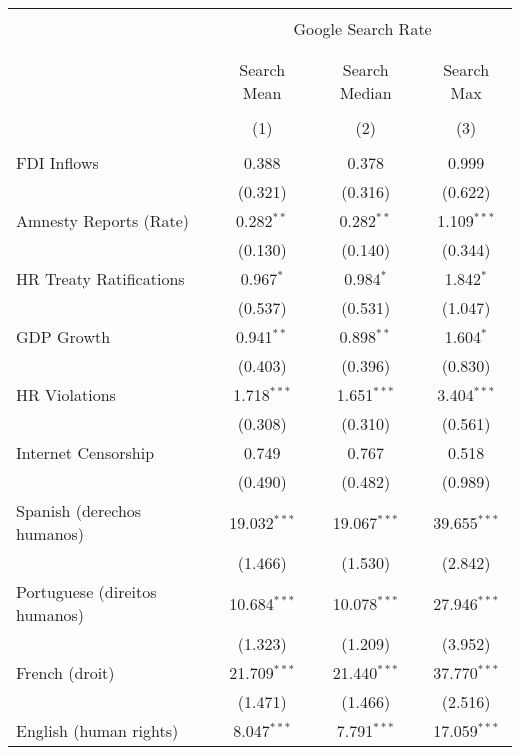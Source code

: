 
\begin{table}[!htbp] \centering 
  \caption{} 
  \label{} 
\begin{tabular}{@{\extracolsep{5pt}}lccc} 
\\[-1.8ex]\hline 
\hline \\[-1.8ex] 
 & \multicolumn{3}{c}{Google Search Rate} \\ 
\cline{2-4} 
\\[-1.8ex] & \multicolumn{3}{c}{ } \\ 
 & Search Mean & Search Median & Search Max \\ 
\\[-1.8ex] & (1) & (2) & (3)\\ 
\hline \\[-1.8ex] 
 FDI Inflows & 0.388 & 0.378 & 0.999 \\ 
  & (0.321) & (0.316) & (0.622) \\ 
  Amnesty Reports (Rate) & 0.282$^{**}$ & 0.282$^{**}$ & 1.109$^{***}$ \\ 
  & (0.130) & (0.140) & (0.344) \\ 
  HR Treaty Ratifications & 0.967$^{*}$ & 0.984$^{*}$ & 1.842$^{*}$ \\ 
  & (0.537) & (0.531) & (1.047) \\ 
  GDP Growth & 0.941$^{**}$ & 0.898$^{**}$ & 1.604$^{*}$ \\ 
  & (0.403) & (0.396) & (0.830) \\ 
  HR Violations & 1.718$^{***}$ & 1.651$^{***}$ & 3.404$^{***}$ \\ 
  & (0.308) & (0.310) & (0.561) \\ 
  Internet Censorship & 0.749 & 0.767 & 0.518 \\ 
  & (0.490) & (0.482) & (0.989) \\ 
  Spanish (derechos humanos) & 19.032$^{***}$ & 19.067$^{***}$ & 39.655$^{***}$ \\ 
  & (1.466) & (1.530) & (2.842) \\ 
  Portuguese (direitos humanos) & 10.684$^{***}$ & 10.078$^{***}$ & 27.946$^{***}$ \\ 
  & (1.323) & (1.209) & (3.952) \\ 
  French (droit) & 21.709$^{***}$ & 21.440$^{***}$ & 37.770$^{***}$ \\ 
  & (1.471) & (1.466) & (2.516) \\ 
  English (human rights) & 8.047$^{***}$ & 7.791$^{***}$ & 17.059$^{***}$ \\ 

\end{tabular}
\end{table}
